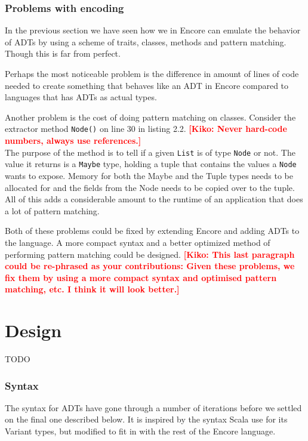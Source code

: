 \documentclass[10pt]{report}
\newcommand{\KIKO}[1]{\textcolor{red}{\textbf{[Kiko: #1]}}}
\begin{document}
\subsection{Problems with encoding}
\par{\noindent In the previous section we have seen how we in Encore can emulate the behavior of ADTs by using a scheme of traits, classes, methods and pattern matching. Though this is far from perfect.\\}
\par{\noindent Perhaps the most noticeable problem is the difference in amount of lines of code needed to create something that behaves like an ADT in Encore compared to languages that has ADTs as actual types.\\}
\par{\noindent Another problem is the cost of doing pattern matching on classes. Consider the extractor method \texttt{Node()} on line 30 in listing 2.2. \KIKO{Never hard-code numbers, always use references.}\\ The purpose of the method is to tell if a given \texttt{List} is of type \texttt{Node} or not. The value it returns is a \texttt{Maybe} type, holding a tuple that contains the values a \texttt{Node} wants to expose. Memory for both the Maybe and the Tuple types needs to be allocated for and the fields from the Node needs to be copied over to the tuple. All of this adds a considerable amount to the runtime of an application that does a lot of pattern matching.\\}
\par{\noindent Both of these problems could be fixed by extending Encore and adding ADTs to the language. A more compact syntax and a better optimized method of performing pattern matching could be designed.}
\KIKO{This last paragraph could be re-phrased as your contributions: Given these problems, we fix them by using a more compact syntax and optimised pattern matching, etc. I think it will look better.}
\chapter{Design}
TODO
\subsection{Syntax}
\par{\noindent The syntax for ADTs have gone through a number of iterations before we settled on the final one described below.  It is inspired by the syntax Scala use for its Variant types, but modified to fit in with the rest of the Encore language.\\}
\end{document}
